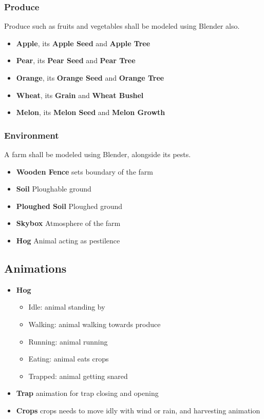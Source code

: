 \documentclass{article}
\begin{document}
\subsubsection{Produce}
Produce such as fruits and vegetables shall be modeled using Blender also.
\begin{itemize} %
\item \textbf{Apple}, its \textbf{Apple Seed} and \textbf{Apple Tree}
\item \textbf{Pear}, its \textbf{Pear Seed} and \textbf{Pear Tree}
\item \textbf{Orange}, its \textbf{Orange Seed} and \textbf{Orange Tree}
\item \textbf{Wheat}, its \textbf{Grain} and \textbf{Wheat Bushel}
\item \textbf{Melon}, its \textbf{Melon Seed} and \textbf{Melon Growth}
\end{itemize} %
\subsubsection{Environment}
A farm shall be modeled using Blender, alongside its pests.
\begin{itemize} %
\item \textbf{Wooden Fence} sets boundary of the farm
\item \textbf{Soil} Ploughable ground
\item \textbf{Ploughed Soil} Ploughed ground
\item \textbf{Skybox} Atmosphere of the farm
\item \textbf{Hog} Animal acting as pestilence
\end{itemize} %
\subsection{Animations}
\begin{itemize} %
\item \textbf{Hog}
\begin{itemize} %
\item Idle: animal standing by
\item Walking: animal walking towards produce
\item Running: animal running
\item Eating: animal eats crops
\item Trapped: animal getting snared
\end{itemize} %
\item \textbf{Trap} animation for trap closing and opening
\item \textbf{Crops} crops needs to move idly with wind or rain, and harvesting animation
\end{itemize}
\end{document}
